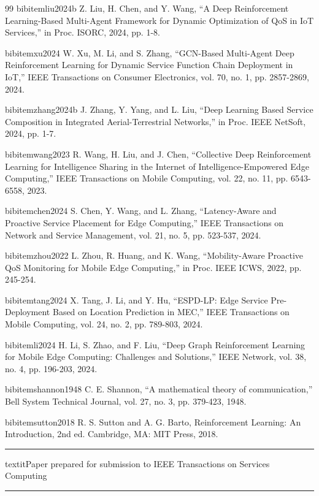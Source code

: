 \begin{thebibliography}{99}
	bibitem{liu2024b} Z. Liu, H. Chen, and Y. Wang, ``A Deep Reinforcement Learning-Based Multi-Agent Framework for Dynamic Optimization of QoS in IoT Services,'' in Proc. ISORC, 2024, pp. 1-8.

	bibitem{xu2024} W. Xu, M. Li, and S. Zhang, ``GCN-Based Multi-Agent Deep Reinforcement Learning for Dynamic Service Function Chain Deployment in IoT,'' IEEE Transactions on Consumer Electronics, vol. 70, no. 1, pp. 2857-2869, 2024.

	bibitem{zhang2024b} J. Zhang, Y. Yang, and L. Liu, ``Deep Learning Based Service Composition in Integrated Aerial-Terrestrial Networks,'' in Proc. IEEE NetSoft, 2024, pp. 1-7.

	bibitem{wang2023} R. Wang, H. Liu, and J. Chen, ``Collective Deep Reinforcement Learning for Intelligence Sharing in the Internet of Intelligence-Empowered Edge Computing,'' IEEE Transactions on Mobile Computing, vol. 22, no. 11, pp. 6543-6558, 2023.

	bibitem{chen2024} S. Chen, Y. Wang, and L. Zhang, ``Latency-Aware and Proactive Service Placement for Edge Computing,'' IEEE Transactions on Network and Service Management, vol. 21, no. 5, pp. 523-537, 2024.

	bibitem{zhou2022} L. Zhou, R. Huang, and K. Wang, ``Mobility-Aware Proactive QoS Monitoring for Mobile Edge Computing,'' in Proc. IEEE ICWS, 2022, pp. 245-254.

	bibitem{tang2024} X. Tang, J. Li, and Y. Hu, ``ESPD-LP: Edge Service Pre-Deployment Based on Location Prediction in MEC,'' IEEE Transactions on Mobile Computing, vol. 24, no. 2, pp. 789-803, 2024.

	bibitem{li2024} H. Li, S. Zhao, and F. Liu, ``Deep Graph Reinforcement Learning for Mobile Edge Computing: Challenges and Solutions,'' IEEE Network, vol. 38, no. 4, pp. 196-203, 2024.

	bibitem{shannon1948} C. E. Shannon, ``A mathematical theory of communication,'' Bell System Technical Journal, vol. 27, no. 3, pp. 379-423, 1948.

	bibitem{sutton2018} R. S. Sutton and A. G. Barto, Reinforcement Learning: An Introduction, 2nd ed. Cambridge, MA: MIT Press, 2018.

\end{thebibliography}

\vspace{1em}
\hrule
\vspace{1em}

textit{Paper prepared for submission to IEEE Transactions on Services Computing}

\vspace{1em}
\hrule